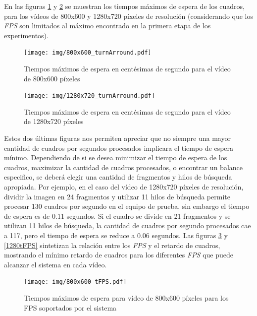 En las figuras \ref{800turnArround} y \ref{1280turnArround} se muestran los
tiempos máximos de espera de los cuadros, para los vídeos de 800x600 y 1280x720
píxeles de resolución (considerando que los \emph{FPS} son limitados al máximo
encontrado en la primera etapa de los experimentos).

\begin{figure}[!h]

	\texttt{[image: img/800x600\_turnArround.pdf]}
	\caption{Tiempos máximos de espera en centésimas de segundo para el
	vídeo de 800x600 píxeles}
	\label{800turnArround}

\end{figure}


\begin{figure}[!h]

	\texttt{[image: img/1280x720\_turnArround.pdf]}
	\caption{Tiempos máximos de espera en centésimas de segundo para el
	vídeo de 1280x720 píxeles}
	\label{1280turnArround}

\end{figure}

Estos dos últimas figuras nos permiten apreciar que no siempre una mayor
cantidad de cuadros por segundos procesados implicara el tiempo de espera
mínimo. Dependiendo de si se desea minimizar el tiempo de espera de los cuadros,
maximizar la cantidad de cuadros procesados, o encontrar un balance especifico,
se deberá elegir una cantidad de fragmentos y hilos de búsqueda apropiada. Por
ejemplo, en el caso del vídeo de 1280x720 píxeles de resolución, dividir la
imagen en 24 fragmentos y utilizar 11 hilos de búsqueda permite procesar 130
cuadros por segundo en el equipo de prueba, sin embargo el tiempo de espera es
de $0.11$ segundos. Si el cuadro se divide en 21 fragmentos y se utilizan 11
hilos de búsqueda, la cantidad de cuadros por segundo procesados cae a 117, pero
el tiempo de espera se reduce a $0.06$ segundos. Las figuras \ref{800tFPS} y
\ref{1280tFPS} sintetizan la relación entre los \emph{FPS} y el retardo de
cuadros, mostrando el mínimo retardo de cuadros para los diferentes \emph{FPS}
que puede alcanzar el sistema en cada vídeo.

\begin{figure}[!h]

	\texttt{[image: img/800x600\_tFPS.pdf]}
	\caption{Tiempos máximos de espera para vídeo de 800x600 píxeles para
	los FPS soportados por el sistema}
	\label{800tFPS}

\end{figure}

